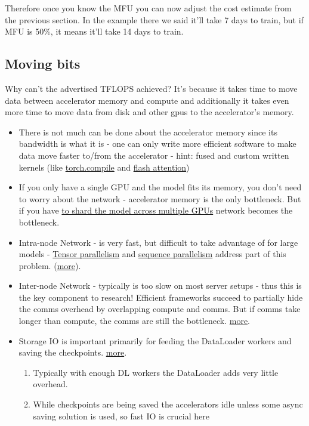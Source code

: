 \documentclass[
]{report}
\providecommand{\tightlist}{%
  \setlength{\itemsep}{0pt}\setlength{\parskip}{0pt}}\usepackage{longtable,booktabs,array}
\begin{document}
Therefore once you know the MFU you can now adjust the cost estimate
from the previous section. In the example there we said it'll take 7
days to train, but if MFU is 50\%, it means it'll take 14 days to train.

\subsection{Moving bits}\label{moving-bits}

Why can't the advertised TFLOPS achieved? It's because it takes time to
move data between accelerator memory and compute and additionally it
takes even more time to move data from disk and other gpus to the
accelerator's memory.

\begin{itemize}
\item
  There is not much can be done about the accelerator memory since its
  bandwidth is what it is - one can only write more efficient software
  to make data move faster to/from the accelerator - hint: fused and
  custom written kernels (like
  \href{https://pytorch.org/docs/stable/generated/torch.compile.html}{torch.compile}
  and \href{https://github.com/Dao-AILab/flash-attention}{flash
  attention})
\item
  If you only have a single GPU and the model fits its memory, you don't
  need to worry about the network - accelerator memory is the only
  bottleneck. But if you have \href{../training/model-parallelism}{to
  shard the model across multiple GPUs} network becomes the bottleneck.
\item
  Intra-node Network - is very fast, but difficult to take advantage of
  for large models -
  \href{../training/model-parallelism\#tensor-parallelism}{Tensor
  parallelism} and
  \href{../training/model-parallelism\#sequence-parallelism}{sequence
  parallelism} address part of this problem.
  (\href{../network/README.md\#intra-node-networking}{more}).
\item
  Inter-node Network - typically is too slow on most server setups -
  thus this is the key component to research! Efficient frameworks
  succeed to partially hide the comms overhead by overlapping compute
  and comms. But if comms take longer than compute, the comms are still
  the bottleneck. \hyperref[inter-node-network]{more}.
\item
  Storage IO is important primarily for feeding the DataLoader workers
  and saving the checkpoints. \hyperref[storage]{more}.

  \begin{enumerate}
  \def\labelenumi{\arabic{enumi}.}
  \tightlist
  \item
    Typically with enough DL workers the DataLoader adds very little
    overhead.
  \item
    While checkpoints are being saved the accelerators idle unless some
    async saving solution is used, so fast IO is crucial here
  \end{enumerate}
\end{itemize}
\end{document}

